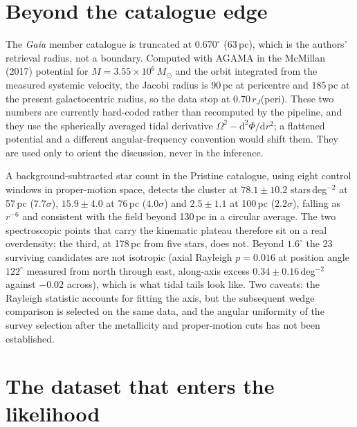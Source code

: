\documentclass[11pt,a4paper]{article}
\begin{document}
\section{Beyond the catalogue edge}

The \emph{Gaia} member catalogue is truncated at $0.670^\circ$ ($63$\,pc), which is the
authors' retrieval radius, not a boundary. Computed with AGAMA in the McMillan (2017)
potential for $M=3.55\times10^6\,M_\odot$ and the orbit integrated from the measured
systemic velocity, the Jacobi radius is $90$\,pc at pericentre and $185$\,pc at the present
galactocentric radius, so the data stop at $0.70\,r_J$(peri). These two numbers are currently
hard-coded rather than recomputed by the pipeline, and they use the spherically averaged
tidal derivative $\Omega^2-\mathrm{d}^2\Phi/\mathrm{d}r^2$; a flattened potential and a
different angular-frequency convention would shift them. They are used only to orient the
discussion, never in the inference.

A background-subtracted star count in the Pristine catalogue, using eight control windows in
proper-motion space, detects the cluster at $78.1\pm10.2$ stars\,deg$^{-2}$ at 57\,pc
($7.7\sigma$), $15.9\pm4.0$ at 76\,pc ($4.0\sigma$) and $2.5\pm1.1$ at 100\,pc
($2.2\sigma$), falling as $r^{-6}$ and consistent with the field beyond 130\,pc in a circular
average. The two spectroscopic points that carry the kinematic plateau therefore sit on a
real overdensity; the third, at 178\,pc from five stars, does not. Beyond $1.6^\circ$ the 23
surviving candidates are not isotropic (axial Rayleigh $p=0.016$ at position angle
$122^\circ$ measured from north through east, along-axis excess $0.34\pm0.16$\,deg$^{-2}$
against $-0.02$ across), which is what tidal tails look like. Two caveats: the Rayleigh
statistic accounts for fitting the axis, but the subsequent wedge comparison is selected on
the same data, and the angular uniformity of the survey selection after the metallicity and
proper-motion cuts has not been established.

\section{The dataset that enters the likelihood}
\end{document}
